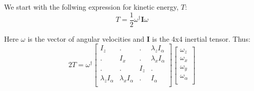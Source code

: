 \documentclass{article}
\begin{document}
We start with the follwing expression for kinetic energy, $T$:
\begin{equation}
	T = \frac{1}{2}\omega^{\dagger}\mathbf{I}\omega
\end{equation}

Here $\omega$ is the vector of angular velocities and $\mathbf{I}$ is the 4x4 inertial tensor. Thus:
\begin{equation}
	2T = \omega^{\dagger}
	\begin{bmatrix}
		I_{z} & . & . & \lambda_{z}I_{\alpha} \\
		. & I_{x} & . & \lambda_{x}I_{\alpha} \\
		. & . & I_{z} & . \\
		\lambda_{z}I_{\alpha} & \lambda_{x}I_{\alpha} & . & I_{\alpha} \\
	\end{bmatrix}
	\begin{bmatrix}
		\omega_{z} \\
		\omega_{x} \\
		\omega_{y} \\
		\omega_{\alpha} \\
	\end{bmatrix}
\end{equation}
\end{document}
